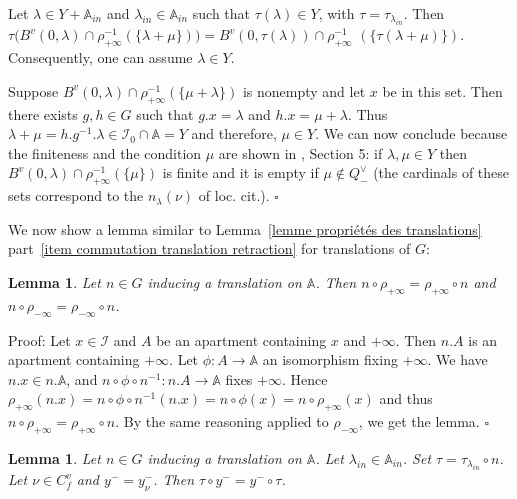 \documentclass[12pt]{article}
\theoremstyle{plain}
\newtheorem{lemme}[thm]{Lemma}
\theoremstyle{definition}
\newcommand{\A}{\mathbb{A}}
\newcommand{\I}{\mathcal{I}}
\begin{document}
Let $\lambda\in Y+\A_{in}$ and $\lambda_{in}\in \A_{in}$ such that $\tau(\lambda)\in Y$, 
with $\tau=\tau_{\lambda_{in}}$. Then 
$\tau\big(B^v(0,\lambda)\cap\rho_{+\infty}^{-1}(\{\lambda+\mu\})\big)=B^v(0,\tau(\lambda))\cap\rho_{+\infty}^{-1}$ $(\{\tau(\lambda+\mu )\})$. Consequently, one can assume $\lambda\in Y$. 

Suppose $B^v(0,\lambda)\cap \rho_{+\infty}^{-1}(\{\mu+\lambda\})$ is nonempty and let $x$ be in this set. Then there exists $g,h\in G$ such that $g.x=\lambda$ and $h.x=\mu+\lambda$. Thus $\lambda+\mu=h.g^{-1}.\lambda\in \I_0\cap \A=Y$ and therefore, $\mu\in Y$. We can now conclude because the finiteness and the condition $\mu$ are shown in \cite{gaussent2014spherical}, Section 5: if $\lambda, \mu\in Y$ then $B^v(0,\lambda)\cap \rho_{+\infty}^{-1}(\{\mu\})$ is finite and it is empty if $\mu\notin Q^\vee_-$ (the cardinals of these sets correspond to the $n_\lambda(\nu)$ of loc. cit.).
$\square$

\vspace{3mm}

We now show a lemma similar to Lemma~\ref{lemme propriétés des translations} part~\ref{item commutation translation retraction} for translations of $G$: 

\begin{lemme}\label{lemme commutation des translations et rétractions}
Let $n\in G$ inducing a translation on $\A$. Then $n\circ\rho_{+\infty}=\rho_{+\infty}\circ n$ and $n\circ \rho_{-\infty}=\rho_{-\infty}\circ n$.
\end{lemme}

Proof: 
Let $x\in\mathcal{I}$ and $A$ be an apartment containing $x$ and $+\infty$. Then $n.A$ is an apartment containing $+\infty$. Let $\phi:A\rightarrow \mathbb{A}$ an isomorphism fixing $+\infty$. We have $n.x\in n.\mathbb{A}$, and $n\circ\phi\circ n^{-1}:n.A\rightarrow \mathbb{A}$ fixes $+\infty$. Hence $\rho_{+\infty}(n.x)=n\circ\phi\circ n^{-1}(n.x)=n\circ\phi(x)=n\circ\rho_{+\infty}(x)$ and thus $n\circ \rho_{+\infty}=\rho_{+\infty}\circ n$. By the same reasoning applied to $\rho_{-\infty}$, we get the lemma. $\square$
 
 
 

\begin{lemme}\label{lemme y- des translatés}
Let $n\in G$ inducing a translation on $\mathbb{A}$. Let $\lambda_{in}\in \A_{in}$. Set $\tau=\tau_{\lambda_{in}}\circ n$. Let $\nu\in C_f^v$ and $y^-=y_\nu^-$. Then $\tau\circ y^-=y^-\circ \tau$.
\end{lemme}
\end{document}
